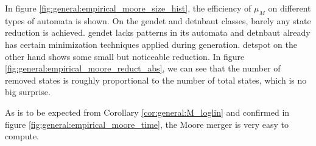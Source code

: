 In figure \ref{fig:general:empirical_moore_size_hist}, the efficiency of $\mu_M$ on different types of automata is shown. On the \textsf{gendet} and \textsf{detnbaut} classes, barely any state reduction is achieved. \textsf{gendet} lacks patterns in its automata and \textsf{detnbaut} already has certain minimization techniques applied during generation. \textsf{detspot} on the other hand shows some small but noticeable reduction. In figure \ref{fig:general:empirical_moore_reduct_abs}, we can see that the number of removed states is roughly proportional to the number of total states, which is no big surprise.

As is to be expected from Corollary \ref{cor:general:M_loglin} and confirmed in figure \ref{fig:general:empirical_moore_time}, the Moore merger is very easy to compute.


